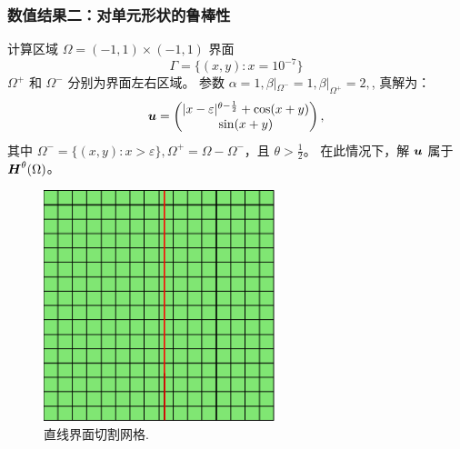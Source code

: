 \documentclass[notheorems,serif]{beamer}
\begin{document}
\begin{frame}
\frametitle{数值结果二：对单元形状的鲁棒性}
\small
\begin{minipage}[b]{0.6\linewidth}
计算区域 $\Omega = (-1, 1)\times(-1, 1)$
界面 
$$
\Gamma = \{(x, y) : x = 10^{-7}\} 
$$
$\Omega^+$ 和 $\Omega^-$ 分别为界面左右区域。
参数 $\alpha = 1, 
\beta|_{\Omega^-} = 1, \beta|_{\Omega^+} = 2,$, 真解为： 
\small
$$
\boldsymbol{u} =
\begin{pmatrix}
|x-\varepsilon|^{\theta-\frac{1}{2}} + \cos(x + y) \\
\sin(x + y)
\end{pmatrix}, 
$$
其中 $\Omega^- = \{(x, y): x > \varepsilon\}, \Omega^+ = \Omega - \Omega^-$，且 $\theta > \frac{1}{2}$。
在此情况下，解 $\boldsymbol{u}$ 属于 $\boldsymbol{H}^{\theta}(\Omega)$。
\end{minipage}
\hfill
\begin{minipage}[b]{0.38\linewidth}
\centering
\begin{figure}[htpb]
    \centering
    \includegraphics[width=0.6\textwidth]{../figures/maxwell/quadmesh.pdf}
    \caption{直线界面切割网格.}
\end{figure}
\vspace{15pt}
\end{minipage}

\end{frame}
\end{document}
